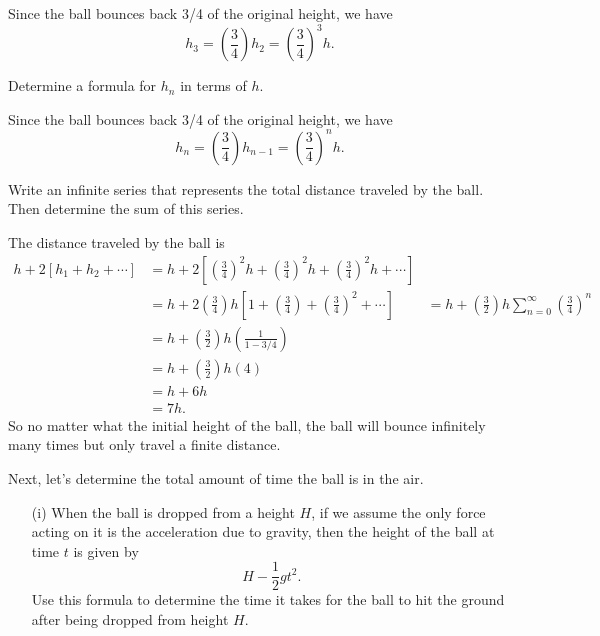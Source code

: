 \begin{exercises}
\begin{exerciseSolution}

Since the ball bounces back 3/4 of the original height, we have
\[h_3 = \left(\frac{3}{4}\right)h_2 = \left(\frac{3}{4}\right)^3h.\]

\end{exerciseSolution}

\item Determine a formula for $h_n$ in terms of $h$.

\begin{exerciseSolution}

Since the ball bounces back 3/4 of the original height, we have
\[h_n = \left(\frac{3}{4}\right)h_{n-1} = \left(\frac{3}{4}\right)^nh.\]

\end{exerciseSolution}

\item Write an infinite series that represents the total distance traveled by the ball. Then determine the sum of this series.

\begin{exerciseSolution}

The distance traveled by the ball is
\begin{align*}
h+2[h_1+h_2+ \cdots ] &= h + 2 \left[ \left(\frac{3}{4}\right)^2h + \left(\frac{3}{4}\right)^2h + \left(\frac{3}{4}\right)^2h + \cdots \right] \\
    &= h + 2\left(\frac{3}{4}\right)h \left[1 + \left(\frac{3}{4}\right) + \left(\frac{3}{4}\right)^2 + \cdots \right]
    &= h + \left(\frac{3}{2}\right)h \sum_{n = 0}^{\infty} \left(\frac{3}{4}\right)^n \\
    &= h + \left(\frac{3}{2}\right)h \left(\frac{1}{1-3/4}\right) \\
    &= h + \left(\frac{3}{2}\right)h (4) \\
    &= h + 6h \\
    &= 7h.
\end{align*}
So no matter what the initial height of the ball, the ball will bounce infinitely many times but only travel a finite distance.

\end{exerciseSolution}

\item Next, let's determine the total amount of time the ball is in the air.
    \begin{itemize}
    \item[(i)] When the ball is dropped from a height $H$, if we assume the only force acting on it is the acceleration due to gravity, then the height of the ball at time $t$ is given by
\[H - \frac{1}{2}gt^2.\]
Use this formula to determine the time it takes for the ball to hit the ground after being dropped from height $H$.


\end{itemize}
\end{exercises}
